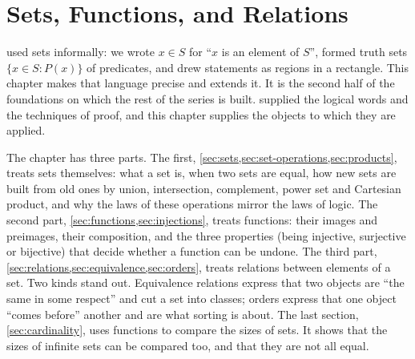 \chapter{Sets, Functions, and Relations}
\label{ch:sets}


 used sets informally: we wrote $x\in S$ for ``$x$ is an element of $S$'', formed truth sets $\{x\in S: P(x)\}$ of predicates, and drew statements as regions in a rectangle. This chapter makes that language precise and extends it. It is the second half of the foundations on which the rest of the series is built.  supplied the logical words and the techniques of proof, and this chapter supplies the objects to which they are applied.

The chapter has three parts. The first, \cref{sec:sets,sec:set-operations,sec:products}, treats sets themselves: what a set is, when two sets are equal, how new sets are built from old ones by union, intersection, complement, power set and Cartesian product, and why the laws of these operations mirror the laws of logic. The second part, \cref{sec:functions,sec:injections}, treats functions: their images and preimages, their composition, and the three properties (being injective, surjective or bijective) that decide whether a function can be undone. The third part, \cref{sec:relations,sec:equivalence,sec:orders}, treats relations between elements of a set. Two kinds stand out. Equivalence relations express that two objects are ``the same in some respect'' and cut a set into classes; orders express that one object ``comes before'' another and are what sorting is about. The last section, \cref{sec:cardinality}, uses functions to compare the sizes of sets. It shows that the sizes of infinite sets can be compared too, and that they are not all equal.

